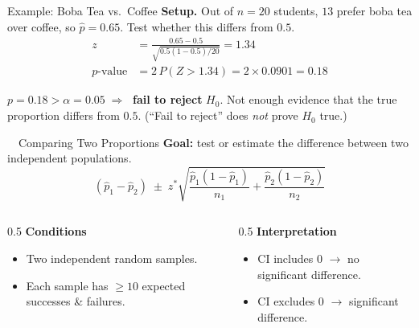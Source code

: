 \documentclass[aspectratio=169,11pt]{beamer}
\begin{document}
\begin{frame}{Example: Boba Tea vs.\ Coffee}
  \small
  \textbf{\color{qrnavy}Setup.} Out of $n = 20$ students, $13$ prefer boba tea over coffee,
  so $\hat{p} = 0.65$. Test whether this differs from $0.5$.
  \vspace{0.3em}
  \begin{align*}
    z &= \frac{0.65 - 0.5}{\sqrt{0.5(1-0.5)/20}} = 1.34\\[0.3em]
    p\text{-value} &= 2\,P(Z > 1.34) = 2 \times 0.0901 = 0.18
  \end{align*}
  \begin{tcolorbox}[colback=qrlight,colframe=qrred,arc=2pt,boxrule=0.6pt]
    \small $p = 0.18 > \alpha = 0.05 \;\Rightarrow\;$ \textbf{fail to reject} $H_0$.
    Not enough evidence that the true proportion differs from $0.5$.
    (``Fail to reject'' does \emph{not} prove $H_0$ true.)
  \end{tcolorbox}
\end{frame}

\begin{frame}{\ \ Comparing Two Proportions}
  \textbf{Goal:} test or estimate the difference between two independent populations.
  \begin{equation*}
    (\hat{p}_1 - \hat{p}_2) \;\pm\; z^{*}\sqrt{\frac{\hat{p}_1(1-\hat{p}_1)}{n_1} + \frac{\hat{p}_2(1-\hat{p}_2)}{n_2}}
  \end{equation*}
  \begin{columns}[T]
    \begin{column}{0.5\textwidth}
      \textbf{\color{qrnavy}Conditions}
      \begin{itemize}
        \item Two independent random samples.
        \item Each sample has $\ge 10$ expected successes \& failures.
      \end{itemize}
    \end{column}
    \begin{column}{0.5\textwidth}
      \textbf{\color{qrnavy}Interpretation}
      \begin{itemize}
        \item CI includes 0 $\rightarrow$ no significant difference.
        \item CI excludes 0 $\rightarrow$ significant difference.
      \end{itemize}
    \end{column}
  \end{columns}
\end{frame}
\end{document}
